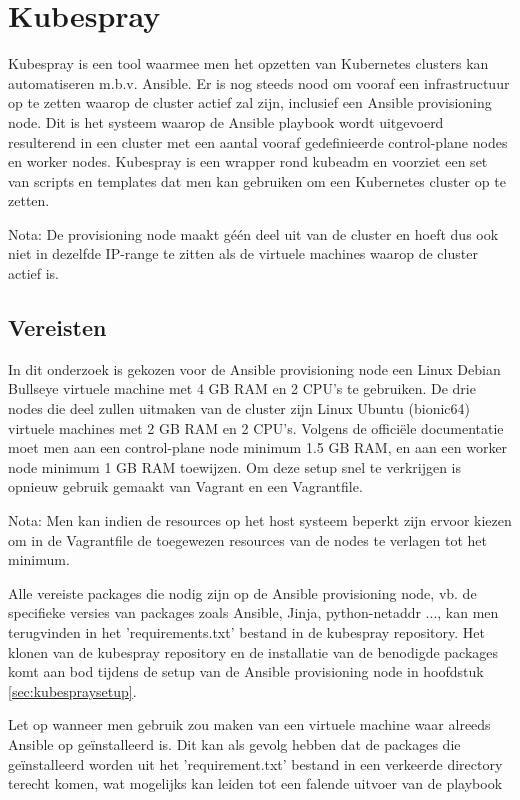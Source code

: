 \section{Kubespray}

Kubespray is een tool waarmee men het opzetten van Kubernetes clusters kan automatiseren m.b.v. Ansible. Er is nog steeds nood om vooraf een infrastructuur op te zetten waarop de cluster actief zal zijn, inclusief een Ansible provisioning node. Dit is het systeem waarop de Ansible playbook wordt uitgevoerd resulterend in een cluster met een aantal vooraf gedefinieerde control-plane nodes en worker nodes. Kubespray is een wrapper rond kubeadm en voorziet een set van scripts en templates dat men kan gebruiken om een Kubernetes cluster op te zetten. \autocite{Matykevich2018}

Nota: De provisioning node maakt géén deel uit van de cluster en hoeft dus ook niet in dezelfde IP-range te zitten als de virtuele machines waarop de cluster actief is.

\subsection{Vereisten}  

In dit onderzoek is gekozen voor de Ansible provisioning node een Linux Debian Bullseye virtuele machine met 4 GB RAM en 2 CPU's te gebruiken. De drie nodes die deel zullen uitmaken van de cluster zijn Linux Ubuntu (bionic64) virtuele machines met 2 GB RAM en 2 CPU's. Volgens de officiële documentatie moet men aan een control-plane node minimum 1.5 GB RAM, en aan een worker node minimum 1 GB RAM toewijzen. Om deze setup snel te verkrijgen is opnieuw gebruik gemaakt van Vagrant en een Vagrantfile. 

Nota: Men kan indien de resources op het host systeem beperkt zijn ervoor kiezen om in de Vagrantfile de toegewezen resources van de nodes te verlagen tot het minimum. 

Alle vereiste packages die nodig zijn op de Ansible provisioning node, vb. de specifieke versies van packages zoals Ansible, Jinja, python-netaddr ..., kan men terugvinden in het 'requirements.txt' bestand in de kubespray repository. \autocite{Kubespray2022} Het klonen van de kubespray repository en de installatie van de benodigde packages komt aan bod tijdens de setup van de Ansible provisioning node in hoofdstuk \ref{sec:kubespraysetup}. 

Let op wanneer men gebruik zou maken van een virtuele machine waar alreeds Ansible op geïnstalleerd is. Dit kan als gevolg hebben dat de packages die geïnstalleerd worden uit het 'requirement.txt' bestand in een verkeerde directory terecht komen, wat mogelijks kan leiden tot een falende uitvoer van de playbook \autocite{Kubespray2022a}

